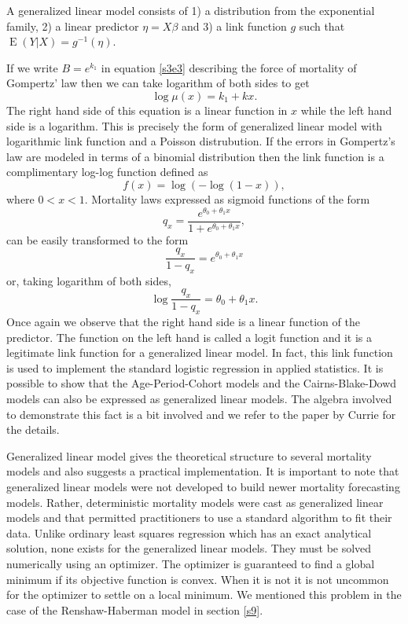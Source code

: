 \documentclass{article}
\numberwithin{equation}{section}
\DeclareMathOperator{\E}{E}
\begin{document}
A generalized linear model consists of 1) a distribution from the exponential
family, 2) a linear predictor $\eta = X\beta$ and 3) a link function $g$
such that $\E(Y|X) = g^{-1}(\eta)$.

If we write $B = e^{k_1}$ in equation \eqref{s3e3} describing the force of
mortality of Gompertz' law then we can take logarithm of both sides to get
\begin{equation}\label{e12e2}
\log\mu(x) = k_1 + kx.
\end{equation}
The right hand side of this equation is a linear function in $x$ while the left
hand side is a logarithm. This is precisely the form of generalized linear
model with logarithmic link function and a Poisson distrubution. If the errors
in Gompertz's law are modeled in terms of a binomial distribution then the
link function is a complimentary log-log function \cite{currie2013fitting} 
defined as
\begin{equation}\label{e12e3}
f(x) = \log(-\log(1 - x)),
\end{equation}
where $0 < x < 1$. Mortality laws expressed as sigmoid functions of the form
\begin{equation}\label{e12e4}
q_x = \frac{e^{\theta_0 + \theta_1 x}}{1 + e^{\theta_0 + \theta_1 x}},
\end{equation}
can be easily transformed to the form
\begin{equation}\label{e12e5}
\frac{q_x}{1 - q_x} = e^{\theta_0 + \theta_1 x}
\end{equation}
or, taking logarithm of both sides,
\begin{equation}\label{e12e6}
\log\frac{q_x}{1 - q_x} = \theta_0 + \theta_1 x.
\end{equation}
Once again we observe that the right hand side is a linear function of the
predictor. The function on the left hand is called a logit function and it is
a legitimate link function for a generalized linear model. In fact, this link
function is used to implement the standard logistic regression in applied
statistics. It is possible to show that the Age-Period-Cohort models and the
Cairns-Blake-Dowd models can also be expressed as generalized linear models. 
The algebra involved to demonstrate this fact is a bit involved and we refer
to the paper by Currie \cite{currie2013fitting} for the details.

Generalized linear model gives the theoretical structure to several mortality
models and also suggests a practical implementation. It is important to note
that generalized linear models were not developed to build newer mortality
forecasting models. Rather, deterministic mortality models were cast as 
generalized linear models and that permitted practitioners to use a standard
algorithm to fit their data. Unlike ordinary least squares regression which
has an exact analytical solution, none exists for the generalized linear models.
They must be solved numerically using an optimizer. The optimizer is guaranteed
to find a global minimum if its objective function is convex. When it is not
it is not uncommon for the optimizer to settle on a local minimum. We mentioned
this problem in the case of the Renshaw-Haberman model in section \ref{s9}.
\end{document}
